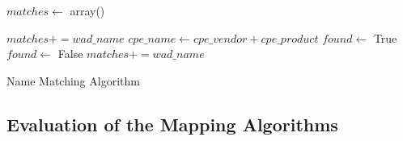 \begin{algorithm}
\begin{algorithmic}
\STATE $matches\gets$ array()


		\STATE $matches+=wad\_name$
		\ELSE
		\STATE $cpe\_name\gets cpe\_vendor + cpe\_product$ 
		\STATE $found\gets$ True
		\STATE $found\gets$ False
		\ENDIF
		\ENDFOR
		\STATE $matches+=wad\_name$
		\ENDIF
		\ENDIF
\ENDFOR
\end{algorithmic}
\caption{Name Matching Algorithm}
\label{matching_algo_2}
\end{algorithm}



 
\subsection{Evaluation of the Mapping Algorithms}

